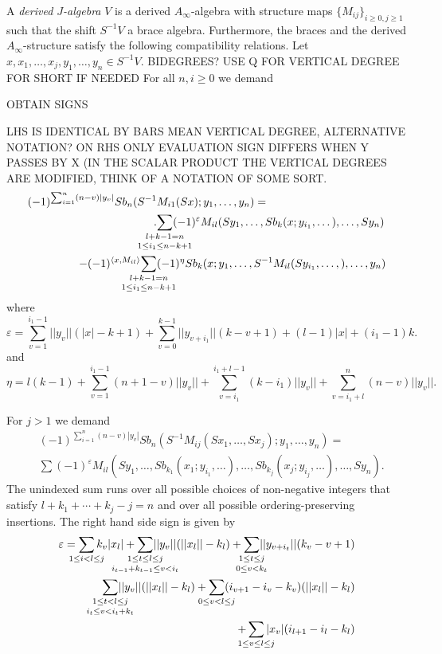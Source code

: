 \documentclass[Thesis.tex]{subfiles}
\begin{document}
\begin{defin}
A \emph{derived $J$-algebra} $V$ is a derived $A_\infty$-algebra with structure maps $\{M_{ij}\}_{i\geq 0, j\geq 1}$ such that the shift $S^{-1}V$ a brace algebra. Furthermore, the braces and the derived $A_\infty$-structure satisfy the following compatibility relations. Let $x, x_1,\dots, x_j, y_1,\dots, y_n\in S^{-1}V$. BIDEGREES? USE Q FOR VERTICAL DEGREE FOR SHORT IF NEEDED For all $n,i\geq 0$ we demand 

OBTAIN SIGNS

LHS IS IDENTICAL BY BARS MEAN VERTICAL DEGREE, ALTERNATIVE NOTATION? ON RHS ONLY EVALUATION SIGN DIFFERS WHEN Y PASSES BY X (IN THE SCALAR PRODUCT THE VERTICAL DEGREES ARE MODIFIED, THINK OF A NOTATION OF SOME SORT. %
\begin{align*}
(-1)^{\sum_{i=1}^n(n-v)|y_v|}Sb_n(S^{-1}&M_{i1}(Sx);y_1,\dots, y_n)=\\.
&\underset{\mathclap{1\leq i_1\leq n-k+1}}{\sum_{\mathclap{l+k-1=n}}}(-1)^{\varepsilon}M_{il}(Sy_1,\dots, Sb_{k}(x;y_{i_1},\dots),\dots, Sy_n)\\
-(-1)^{\langle x,M_{il}\rangle}\underset{\mathclap{1\leq i_1\leq n-k+1}}{\sum_{\mathclap{l+k-1=n}}}&(-1)^{\eta} Sb_k(x;y_1,\dots, S^{-1}M_{il}(Sy_{i_1},\dots,), \dots, y_n)
\end{align*}
where
\[
\varepsilon = \sum_{v=1}^{i_1-1}||y_v||(|x|-k+1)+\sum_{v=0}^{k-1}||y_{v+i_1}||(k-v+1)+(l-1)|x|+(i_1-1)k.
\]
and
\[
\eta=l(k-1)+\sum_{v=1}^{i_1-1}(n+1-v)||y_v||+\sum_{v=i_1}^{i_1+l-1}(k-i_1)||y_v||+\sum_{v=i_1+l}^n(n-v)||y_v||.
\]

For $j>1$ we demand
\begin{align*}
&(-1)^{\sum_{i=1}^n(n-v)|y_v|}Sb_n(S^{-1}M_{ij}(Sx_1,\dots, Sx_j);y_1,\dots, y_n)=\\
&\sum(-1)^{\varepsilon}M_{il}(Sy_1,\dots, Sb_{k_1}(x_1;y_{i_1},\dots),\dots, Sb_{k_j}(x_j;y_{i_j},\dots),\dots, Sy_n).
\end{align*}
The unindexed sum runs over all possible choices of non-negative integers that satisfy $l+k_1+\cdots+k_j-j=n$ and over all possible ordering-preserving insertions. The right hand side sign is given by 
\begin{align*}
\varepsilon = \sum_{\mathclap{1\leq i< l\leq j}}k_v|x_l|+\underset{\mathclap{i_{t-1}+k_{t-1}\leq v< i_t}}{\sum_{\mathclap{1\leq t\leq l\leq j}}}||y_v||(||x_l||-k_l)+\underset{\mathclap{0\leq v< k_t}}{\sum_{\mathclap{1\leq t\leq j}}} ||y_{v+i_t}||(k_v-v+1)\\
\underset{\mathclap{i_t\leq v< i_t+k_t}}{\sum_{\mathclap{1\leq t< l\leq j}}}||y_v||(||x_l||-k_l)+\sum_{\mathclap{0\leq v<l\leq j}}(i_{v+1}-i_v-k_v)(||x_l||-k_l)\\+\sum_{\mathclap{1\leq v\leq l\leq j}} |x_v|(i_{l+1}-i_l-k_l)
\end{align*}
\end{defin}
\end{document}
